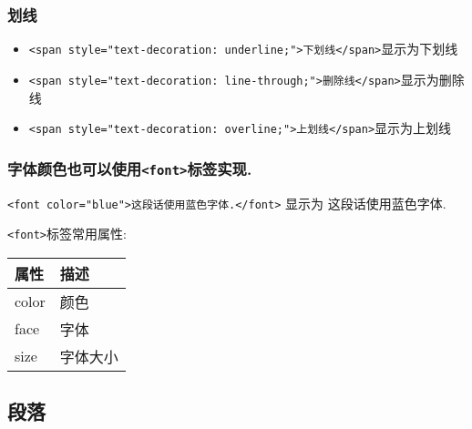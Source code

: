 \documentclass[]{ctexbook}
\begin{document}
\hypertarget{ux5212ux7ebf}{%
\subsubsection{划线}\label{ux5212ux7ebf}}

\begin{itemize}
\item
  \texttt{\textless{}span\ style="text-decoration:\ underline;"\textgreater{}下划线\textless{}/span\textgreater{}}显示为{下划线}
\item
  \texttt{\textless{}span\ style="text-decoration:\ line-through;"\textgreater{}删除线\textless{}/span\textgreater{}}显示为{删除线}
\item
  \texttt{\textless{}span\ style="text-decoration:\ overline;"\textgreater{}上划线\textless{}/span\textgreater{}}显示为{上划线}
\end{itemize}

\hypertarget{ux5b57ux4f53ux989cux8272ux4e5fux53efux4ee5ux4f7fux7528fontux6807ux7b7eux5b9eux73b0.}{%
\subsubsection{\texorpdfstring{字体颜色也可以使用\texttt{\textless{}font\textgreater{}}标签实现.}{字体颜色也可以使用\textless font\textgreater 标签实现.}}\label{ux5b57ux4f53ux989cux8272ux4e5fux53efux4ee5ux4f7fux7528fontux6807ux7b7eux5b9eux73b0.}}

\texttt{\textless{}font\ color="blue"\textgreater{}这段话使用蓝色字体.\textless{}/font\textgreater{}} 显示为 这段话使用蓝色字体.

\texttt{\textless{}font\textgreater{}}标签常用属性:

\begin{longtable}[]{@{}ll@{}}
\toprule
属性 & 描述\tabularnewline
\midrule
\endhead
color & 颜色\tabularnewline
face & 字体\tabularnewline
size & 字体大小\tabularnewline
\bottomrule
\end{longtable}

\hypertarget{ux6bb5ux843d}{%
\subsection{段落}\label{ux6bb5ux843d}}
\end{document}
